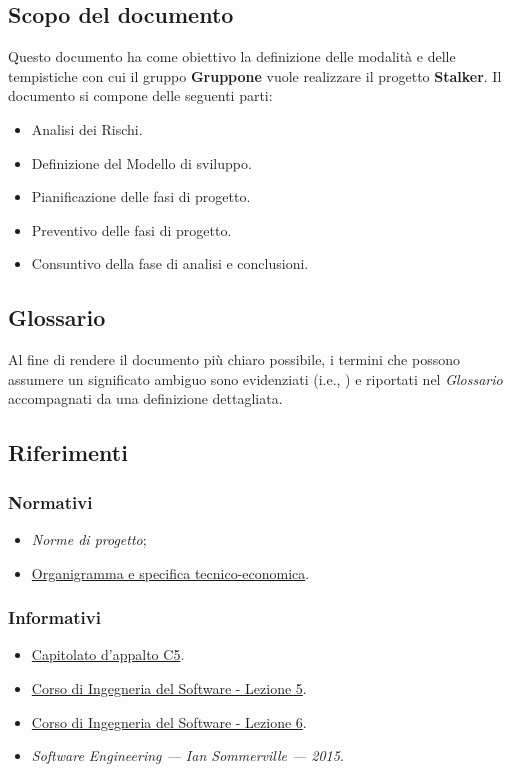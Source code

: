 \documentclass[../piano-di-progetto.tex]{subfiles}
\begin{document}
\subsection{Scopo del documento}%
\label{sub:scopo_del_documento}
Questo documento ha come obiettivo la definizione delle modalità e delle tempistiche con cui il gruppo \textbf{Gruppone} vuole realizzare il progetto \textbf{Stalker}.
Il documento si compone delle seguenti parti:
\begin{itemize}
  \item Analisi dei Rischi.
  \item Definizione del Modello di sviluppo.
  \item Pianificazione delle fasi di progetto.
  \item Preventivo delle fasi di progetto.
  \item Consuntivo della fase di analisi e conclusioni.
\end{itemize}
\subsection{Glossario}%
\label{sub:glossario}
Al fine di rendere il documento più chiaro possibile, i termini che possono assumere un significato ambiguo sono evidenziati (i.e., ) e riportati nel \textit{Glossario} accompagnati da una definizione dettagliata.
\subsection{Riferimenti}%
\label{sub:riferimenti}
\subsubsection{Normativi}%
\label{subs:normativi}
\begin{itemize}
  \item \textit{Norme di progetto};
  \item \href{https://www.math.unipd.it/~tullio/IS-1/2019/Progetto/RO.html}{Organigramma e specifica tecnico-economica}.
\end{itemize}
\subsubsection{Informativi}%
\label{subs:informativi}
\begin{itemize}
  \item \href{https://www.math.unipd.it/~tullio/IS-1/2019/Progetto/C5.pdf}{Capitolato d'appalto C5}.
  \item \href{https://www.math.unipd.it/~tullio/IS-1/2019/Dispense/L05.pdf}{Corso di Ingegneria del Software - Lezione 5}.
  \item \href{https://www.math.unipd.it/~tullio/IS-1/2019/Dispense/L06.pdf}{Corso di Ingegneria del Software - Lezione 6}.
  \item \textit{Software Engineering --- Ian Sommerville --- 2015}.
\end{itemize}%
\end{document}
